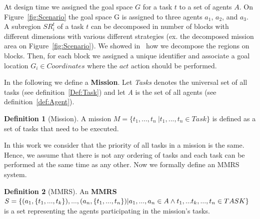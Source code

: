 \documentclass[journal]{IEEEtran}
\theoremstyle{definition}
\newtheorem{definition}{Definition}
\newcommand\ivano[1]{\nb{Ivano}{#1}}
\begin{document}



At design time we assigned the goal space $G$ for a task $t$ to a set of agents $A$. On Figure~\ref{fig:Scenario} the goal space G is assigned to three agents $a_1$, $a_2$, and $a_3$. A subregion $SR^t_i$ of a task $t$ can be decomposed in number of blocks with different dimensions with various different strategies (ex. the decomposed mission area on Figure~\ref{fig:Scenario}). We showed in~\cite{bozhinoski2015flyaq, di2013engineering} how we decompose the regions on blocks.  
Then, for each block we assigned a unique identifier and associate a goal location $G_i \in Coordinates$ where the $act$ action should be performed.






In the following we define a \textbf{Mission}.
Let \textit{Tasks} denotes the universal set of all tasks (see definition~\ref{Def:Task}) and let \textit{A} is the set of all agents (see definition~\ref{def:Agent}).
\begin{definition}[Mission]
A mission $M=\{t_1, ... , t_n \ \vert t_1, ..., t_n \in Task \}$  is defined as a set of tasks that need to be executed.
\end{definition}

In this work we consider that the priority of all tasks in a mission is the same. Hence, we assume that there is not any ordering of tasks and each task can be performed at the same time as any other. 
Now we formally define an MMRS system. 

\begin{definition}[MMRS]\label{def:MMRS}
An \textbf{MMRS} 
$S=\{(a_1, \{t_1,...,t_k\}),... , \\(a_n,\{t_1,...,t_n\}) \vert a_1, ... , a_n \in A  \land t_1,...t_k,...,t_n  \in TASK\}$ is a set representing the agents participating in the mission's tasks.
\end{definition}
\end{document}
